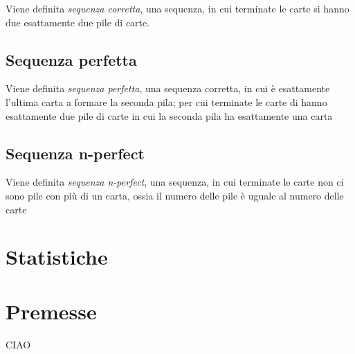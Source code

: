 \documentclass[a4paper]{article}
\begin{document}
Viene definita \emph{sequenza corretta}, una sequenza, in cui terminate le carte si hanno due esattamente due pile di carte.


\subsection{Sequenza perfetta}

Viene definita \emph{sequenza perfetta}, una sequenza corretta, in cui è esattamente l'ultima carta a formare la seconda pila; per cui terminate le carte di hanno esattamente due pile di carte in cui la seconda pila ha esattamente una carta




\subsection{Sequenza n-perfect}

Viene definita \emph{sequenza n-perfect}, una sequenza, in cui terminate le carte non ci sono pile con più di un carta, ossia il numero delle pile è uguale al numero delle carte



\newpage

\section{Statistiche}



\section{Premesse}

CIAO
\end{document}

